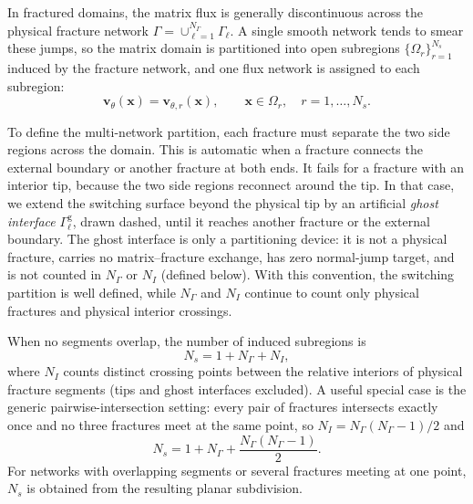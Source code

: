 \documentclass[a4paper,fleqn]{cas-sc}
\newcommand{\vflux}{\mathbf{v}}
\begin{document}
In fractured domains, the matrix flux is generally discontinuous across the
physical fracture network
\(\Gamma=\cup_{\ell=1}^{N_\Gamma}\Gamma_\ell\). A single smooth network tends
to smear these jumps, so the matrix domain is partitioned into open subregions
\(\{\Omega_r\}_{r=1}^{N_s}\) induced by the fracture network, and one flux
network is assigned to each subregion:
\begin{equation}
\vflux_\theta(\mathbf{x})
=
\vflux_{\theta,r}(\mathbf{x}),
\qquad \mathbf{x}\in\Omega_r,\quad r=1,\ldots,N_s .
\label{eq:multi_network_flux}
\end{equation}

To define the multi-network partition, each fracture must separate the two
side regions across the domain. This is automatic when a fracture connects the
external boundary or another fracture at both ends. It fails for a fracture with
an interior tip, because the two side regions reconnect around the tip. In that
case, we extend the switching surface beyond the physical tip by an artificial
\emph{ghost interface} \(\Gamma_\ell^{\mathrm{g}}\), drawn dashed, until it
reaches another fracture or the external boundary. The ghost interface is only a
partitioning device: it is not a physical fracture, carries no matrix--fracture
exchange, has zero normal-jump target, and is not counted in \(N_\Gamma\) or
\(N_I\) (defined below). With this convention, the switching partition is well
defined, while \(N_\Gamma\) and \(N_I\) continue to count only physical fractures
and physical interior crossings.

When no segments overlap, the number of induced subregions is
\[
  N_s=1+N_\Gamma+N_I,
\]
where \(N_I\) counts distinct crossing points between the relative interiors of
physical fracture segments (tips and ghost interfaces excluded). A useful
special case is the generic pairwise-intersection setting: every pair of
fractures intersects exactly once and no three fractures meet at the same point,
so \(N_I=N_\Gamma(N_\Gamma-1)/2\) and
\[
  N_s=1+N_\Gamma+\frac{N_\Gamma(N_\Gamma-1)}{2}.
\]
For networks with overlapping segments or several fractures meeting at one point,
\(N_s\) is obtained from the resulting planar subdivision.
\end{document}
